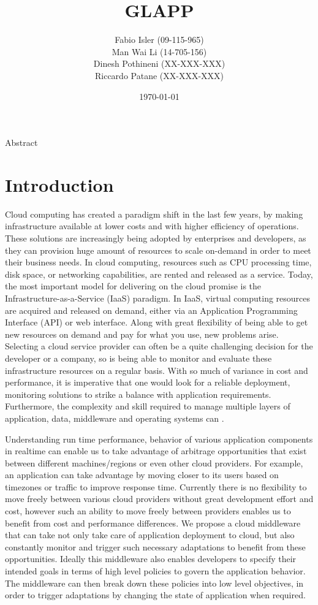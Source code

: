 \documentclass{seal_thesis}
\date{\today}
\title{GLAPP}
\subtitle{}
\author{
Fabio Isler \textmd{(09-115-965)} \\
Man Wai Li \textmd{(14-705-156)} \\
Dinesh Pothineni \textmd{(XX-XXX-XXX)} \\
Riccardo Patane \textmd{(XX-XXX-XXX)}}
\begin{document}
\maketitle

\abstract
Abstract


\chapter{Introduction}
Cloud computing has created a paradigm shift in the last few years, by making infrastructure available at lower costs and with higher efficiency of operations.
These solutions are increasingly being adopted by enterprises and developers, as they can provision huge amount of resources to scale on-demand in order to meet their business needs.
In cloud computing, resources such as CPU processing time, disk space, or networking capabilities, are rented and released as a service.
Today, the most important model for delivering on the cloud promise is the Infrastructure-as-a-Service (IaaS) paradigm.
In IaaS, virtual computing resources are acquired and released on demand, either via an Application Programming Interface (API) or web interface.
Along with great flexibility of being able to get new resources on demand and pay for what you use, new problems arise.
Selecting a cloud service provider can often be a quite challenging decision for the developer or a company, so is being able to monitor and evaluate these infrastructure resources on a regular basis.
With so much of variance in cost and performance, it is imperative that one would look for a reliable deployment, monitoring solutions to strike a balance with application requirements.
Furthermore, the complexity and skill required to manage multiple layers of application, data, middleware and operating systems can .

Understanding run time performance, behavior of various application components in realtime can enable us to take advantage of arbitrage opportunities that exist between different machines/regions or even other cloud providers.
For example, an application can take advantage by moving closer to its users based on timezones or traffic to improve response time.
Currently there is no flexibility to move freely between various cloud providers without great development effort and cost, however such an ability to move freely between providers enables us to benefit from cost and performance differences.
We propose a cloud middleware that can take not only take care of application deployment to cloud, but also constantly monitor and trigger such necessary adaptations to benefit from these opportunities.
Ideally this middleware also enables developers to specify their intended goals in terms of high level policies to govern the application behavior.
The middleware can then break down these policies into low level objectives, in order to trigger adaptations by changing the state of application when required.
\end{document}
